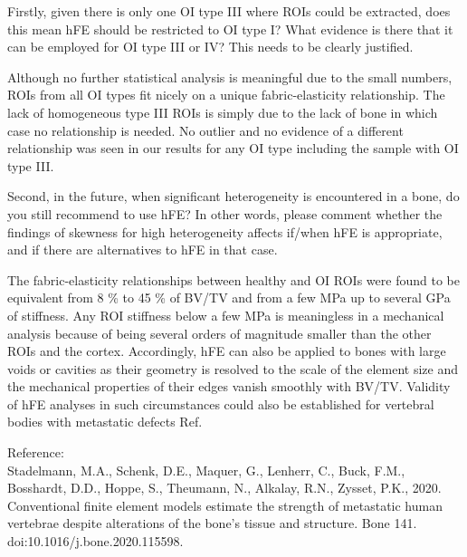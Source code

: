 \documentclass{AR2RC}
\begin{document}
\newpage
\RC Firstly, given there is only one OI type III where ROIs could be extracted, does this mean hFE should be restricted to OI type I? What evidence is there that it can be employed for OI type III or IV? This needs to be clearly justified. 

\AR Although no further statistical analysis is meaningful due to the small numbers, ROIs from all OI types fit nicely on a unique fabric-elasticity relationship. The lack of homogeneous type III ROIs is simply due to the lack of bone in which case no relationship is needed. No outlier and no evidence of a different relationship was seen in our results for any OI type including the sample with OI type III.

\RC Second, in the future, when significant heterogeneity is encountered in a bone, do you still recommend to use hFE? In other words, please comment whether the findings of skewness for high heterogeneity affects if/when hFE is appropriate, and if there are alternatives to hFE in that case.

\AR The fabric-elasticity relationships between healthy and OI ROIs were found to be equivalent from 8 \% to 45 \% of BV/TV and from a few MPa up to several GPa of stiffness. Any ROI stiffness below a few MPa is meaningless in a mechanical analysis because of being several orders of magnitude smaller than the other ROIs and the cortex. Accordingly, hFE can also be applied to bones with large voids or cavities as their geometry is resolved to the scale of the element size and the mechanical properties of their edges vanish smoothly with BV/TV. Validity of hFE analyses in such circumstances could also be established for vertebral bodies with metastatic defects Ref.

Reference:\\
Stadelmann, M.A., Schenk, D.E., Maquer, G., Lenherr, C., Buck,
F.M., Bosshardt, D.D., Hoppe, S., Theumann, N., Alkalay, R.N.,
Zysset, P.K., 2020. Conventional finite element models estimate
the strength of metastatic human vertebrae despite alterations of the
bone’s tissue and structure. Bone 141. doi:10.1016/j.bone.2020.115598.



\end{document}
